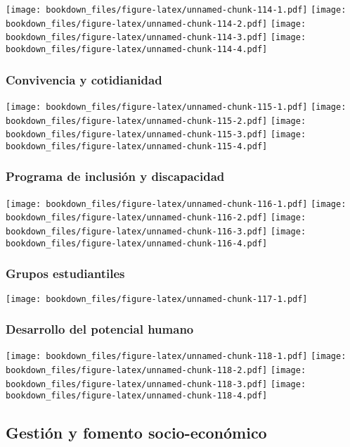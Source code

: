 \documentclass[]{article}
\theoremstyle{definition}
\theoremstyle{definition}
\theoremstyle{definition}
\theoremstyle{remark}
\begin{document}
\texttt{[image: bookdown\_files/figure-latex/unnamed-chunk-114-1.pdf]}
\texttt{[image: bookdown\_files/figure-latex/unnamed-chunk-114-2.pdf]}
\texttt{[image: bookdown\_files/figure-latex/unnamed-chunk-114-3.pdf]}
\texttt{[image: bookdown\_files/figure-latex/unnamed-chunk-114-4.pdf]}

\subsubsection{Convivencia y
cotidianidad}\label{convivencia-y-cotidianidad}

\texttt{[image: bookdown\_files/figure-latex/unnamed-chunk-115-1.pdf]}
\texttt{[image: bookdown\_files/figure-latex/unnamed-chunk-115-2.pdf]}
\texttt{[image: bookdown\_files/figure-latex/unnamed-chunk-115-3.pdf]}
\texttt{[image: bookdown\_files/figure-latex/unnamed-chunk-115-4.pdf]}

\subsubsection{Programa de inclusión y
discapacidad}\label{programa-de-inclusion-y-discapacidad}

\texttt{[image: bookdown\_files/figure-latex/unnamed-chunk-116-1.pdf]}
\texttt{[image: bookdown\_files/figure-latex/unnamed-chunk-116-2.pdf]}
\texttt{[image: bookdown\_files/figure-latex/unnamed-chunk-116-3.pdf]}
\texttt{[image: bookdown\_files/figure-latex/unnamed-chunk-116-4.pdf]}

\subsubsection{Grupos estudiantiles}\label{grupos-estudiantiles}

\texttt{[image: bookdown\_files/figure-latex/unnamed-chunk-117-1.pdf]}

\subsubsection{Desarrollo del potencial
humano}\label{desarrollo-del-potencial-humano}

\texttt{[image: bookdown\_files/figure-latex/unnamed-chunk-118-1.pdf]}
\texttt{[image: bookdown\_files/figure-latex/unnamed-chunk-118-2.pdf]}
\texttt{[image: bookdown\_files/figure-latex/unnamed-chunk-118-3.pdf]}
\texttt{[image: bookdown\_files/figure-latex/unnamed-chunk-118-4.pdf]}

\subsection{Gestión y fomento
socio-económico}\label{gestion-y-fomento-socio-economico}
\end{document}
